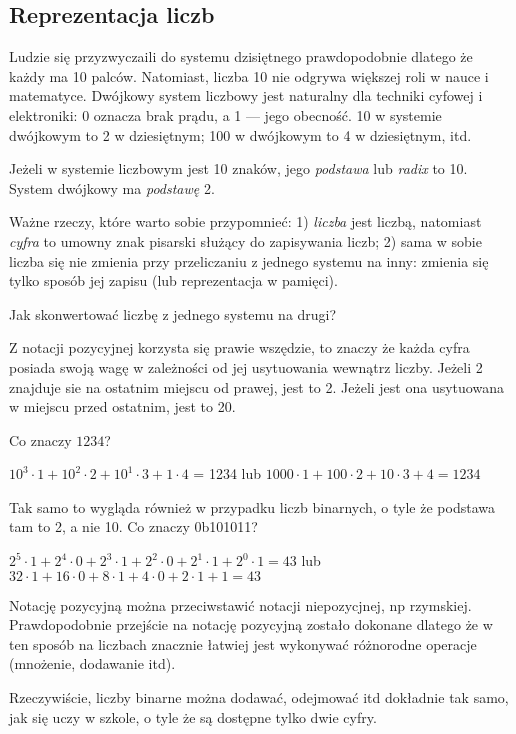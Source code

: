 \subsection{Reprezentacja liczb}

Ludzie się przyzwyczaili do systemu dzisiętnego prawdopodobnie dlatego że każdy ma 10 palców.
Natomiast, liczba 10 nie odgrywa większej roli w nauce i matematyce.
Dwójkowy system liczbowy jest naturalny dla techniki cyfowej i elektroniki: 0 oznacza brak prądu, a 1 --- jego obecność.
10 w systemie dwójkowym to 2 w dziesiętnym; 100 w dwójkowym to 4 w dziesiętnym, itd.

Jeżeli w systemie liczbowym jest 10 znaków, jego \emph{podstawa} lub \emph{radix} to 10.
System dwójkowy ma \emph{podstawę} 2.

Ważne rzeczy, które warto sobie przypomnieć:
1) \emph{liczba} jest liczbą, natomiast \emph{cyfra} to umowny znak pisarski służący do zapisywania liczb;
2) sama w sobie liczba się nie zmienia przy przeliczaniu z jednego systemu na inny: zmienia się tylko sposób jej zapisu (lub reprezentacja w pamięci).

Jak skonwertować liczbę z jednego systemu na drugi?

Z notacji pozycyjnej korzysta się prawie wszędzie, to znaczy że każda cyfra posiada swoją wagę w zależności od jej usytuowania wewnątrz liczby.
Jeżeli 2 znajduje sie na ostatnim miejscu od prawej, jest to 2.
Jeżeli jest ona usytuowana w miejscu przed ostatnim, jest to 20.

Co znaczy $1234$?

$10^3 \cdot 1 + 10^2 \cdot 2 + 10^1 \cdot 3 + 1 \cdot 4$ = 1234 lub
$1000 \cdot 1 + 100 \cdot 2 + 10 \cdot 3 + 4 = 1234$

Tak samo to wygląda również w przypadku liczb binarnych, o tyle że podstawa tam to 2, a nie 10.
Co znaczy 0b101011?

$2^5 \cdot 1 + 2^4 \cdot 0 + 2^3 \cdot 1 + 2^2 \cdot 0 + 2^1 \cdot 1 + 2^0 \cdot 1 = 43$ lub
$32 \cdot 1 + 16 \cdot 0 + 8 \cdot 1 + 4 \cdot 0 + 2 \cdot 1 + 1 = 43$

Notację pozycyjną można przeciwstawić notacji niepozycjnej, np rzymskiej.
Prawdopodobnie przejście na notację pozycyjną zostało dokonane dlatego że w ten sposób na liczbach znacznie łatwiej jest wykonywać różnorodne operacje (mnożenie, dodawanie itd).

Rzeczywiście, liczby binarne można dodawać, odejmować itd dokładnie tak samo, jak się uczy w szkole, o tyle że są dostępne tylko dwie cyfry.

